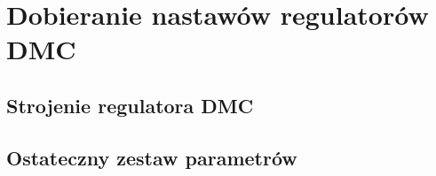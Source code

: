 \chapter{Dobieranie nastawów regulatorów DMC}
\label{dmc}

\section{Strojenie regulatora DMC}
\label{dmc_strojenie}

\section{Ostateczny zestaw parametrów}
\label{dmc_result}